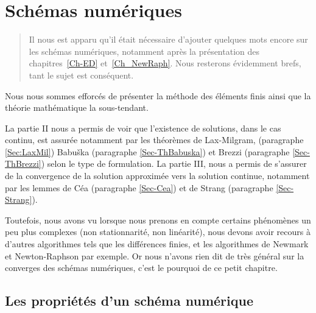 \chapter{Schémas numériques}\label{Ch-shemanum}
\begin{abstract}
Il nous est apparu qu'il était nécessaire d'ajouter quelques mots encore sur les schémas numériques,
notamment après la présentation des chapitres~\ref{Ch-ED} et~\ref{Ch_NewRaph}. Nous resterons
évidemment brefs, tant le sujet est conséquent.
\end{abstract}


\medskip
Nous nous sommes efforcés de présenter la méthode des éléments finis ainsi que la théorie mathématique la
sous-tendant.

La partie II nous a permis de voir que l'existence de solutions, dans le cas continu, est assurée notamment par
les théorèmes de Lax-Milgram,
(paragraphe \ref{Sec:LaxMil}) Babuška (paragraphe \ref{Sec-ThBabuska}) et
Brezzi\label{Sec:Brezzi} (paragraphe \ref{Sec-ThBrezzi}) selon le type de formulation.
La partie III, nous a permis de s'assurer de la convergence de la solution approximée vers la solution continue, notamment par les
lemmes de Céa (paragraphe \ref{Sec-Cea}) et de
Strang (paragraphe \ref{Sec-Strang}).

Toutefois, nous avons vu lorsque nous prenons en compte certains phénomènes un peu plus complexes (non stationnarité, non linéarité),
nous devons avoir recours à d'autres algorithmes tels que les différences finies, et les algorithmes de Newmark et Newton-Raphson par
exemple. Or nous n'avons rien dit de très général sur la converges des schémas numériques, c'est le pourquoi de ce petit chapitre.


\medskip
\section{Les propriétés d'un schéma numérique}


\medskip
